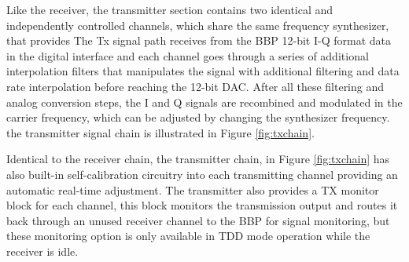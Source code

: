 
Like the receiver, the transmitter section contains two identical and
independently controlled channels, which share the same frequency synthesizer,
that provides The Tx signal path receives from the BBP 12-bit I-Q format data in
the digital interface and each channel goes through a series of additional
interpolation filters that manipulates the signal with additional filtering and
data rate interpolation before reaching the 12-bit DAC. After all these
filtering and analog conversion steps, the I and Q signals are recombined and
modulated in the carrier frequency, which can be adjusted by changing the
synthesizer frequency. the transmitter signal chain is illustrated in Figure
\ref{fig:txchain}.

Identical to the receiver chain, the transmitter chain, in Figure
\ref{fig:txchain} has also built-in self-calibration circuitry into each
transmitting channel providing an automatic real-time adjustment. The
transmitter also provides a TX monitor block for each channel, this block
monitors the transmission output and routes it back through an unused receiver
channel to the BBP for signal monitoring, but these monitoring option is only
available in TDD mode operation while the receiver is idle.

